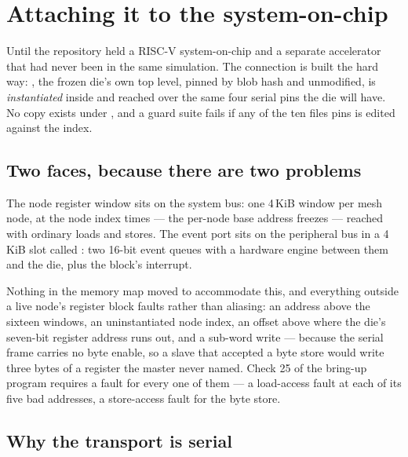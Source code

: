 \section{Attaching it to the system-on-chip}

Until  the repository held a RISC-V system-on-chip and a
separate accelerator that had never been in the same simulation. The
connection is built the hard way: , the
frozen die's own top level, pinned by blob hash and unmodified, is
\emph{instantiated} inside 
and reached over the same four serial pins the die will have. No copy
exists under , and a guard suite fails if any of the ten files
 pins is edited against the index.

\subsection{Two faces, because there are two problems}

The node register window sits on the system bus: one 4\,KiB window per
mesh node, at the node index times  --- the per-node base
address  freezes --- reached with ordinary loads
and stores. The event port sits on the peripheral bus in a 4\,KiB slot
called : two 16-bit event queues with a hardware engine
between them and the die, plus the block's interrupt.

Nothing in the memory map moved to accommodate this, and everything
outside a live node's register block faults rather than aliasing: an
address above the sixteen windows, an uninstantiated node index, an
offset above  where the die's seven-bit register address
runs out, and a sub-word write --- because the serial frame carries no
byte enable, so a slave that accepted a byte store would write three
bytes of a register the master never named. Check 25 of the bring-up
program requires a fault for every one of them --- a load-access fault
at each of its five bad addresses, a store-access fault for the byte
store.

\subsection{Why the transport is serial}

